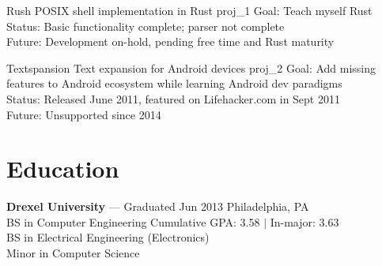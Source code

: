 \documentclass[10pt]{barag_resume}
\begin{document}
    \begin{project}
        {Rush}
        {POSIX shell implementation in Rust}
        {proj_1}
            Goal: Teach myself Rust\\
            Status: Basic functionality complete; parser not complete\\
            Future: Development on-hold, pending free time and Rust maturity
    \end{project}

    \begin{project}
        {Textspansion}
        {Text expansion for Android devices}
        {proj_2}
            Goal: Add missing features to Android ecosystem while learning Android dev paradigms\\
            Status: Released June 2011, featured on Lifehacker.com in Sept 2011\\
            Future: Unsupported since 2014
    \end{project}

    \newpage %
\section{Education}\relax
    {\large\textbf{Drexel University}} --- Graduated Jun 2013 \hfill{\small Philadelphia, PA}\\
    BS in Computer Engineering \hfill Cumulative GPA: 3.58 $|$ In-major: 3.63\\
    BS in Electrical Engineering (Electronics)\\
    Minor in Computer Science\\
\end{document}
